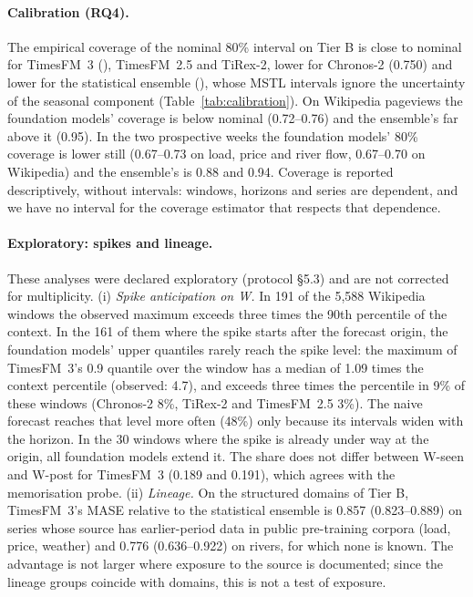 \paragraph{Calibration (RQ4).} The empirical coverage of the nominal 80\% interval on Tier B is close to nominal for TimesFM~3
(\CovBtfm{}), TimesFM~2.5 and TiRex-2, lower for Chronos-2 (0.750) and lower for the statistical ensemble (\CovBstat{}), whose MSTL
intervals ignore the uncertainty of the seasonal component (Table~\ref{tab:calibration}). On Wikipedia pageviews the foundation models'
coverage is below nominal (0.72--0.76) and the ensemble's far above it (0.95). In the two prospective weeks the foundation models'
80\% coverage is lower still (0.67--0.73 on load, price and river flow, 0.67--0.70 on Wikipedia) and the ensemble's is 0.88 and
0.94. Coverage is reported descriptively, without
intervals: windows, horizons and series are dependent, and we have no interval for the coverage estimator that respects that
dependence.

\paragraph{Exploratory: spikes and lineage.} These analyses were declared exploratory (protocol \S{}5.3) and are not corrected for
multiplicity. (i) \emph{Spike anticipation on W.} In 191 of the 5{,}588 Wikipedia windows the observed maximum exceeds three times
the 90th percentile of the context. In the 161 of them where the spike starts after the forecast origin, the foundation models' upper
quantiles rarely reach the spike level: the maximum of TimesFM~3's 0.9 quantile over the window has a median of 1.09 times the context percentile (observed:
4.7), and exceeds three times the percentile in 9\% of these windows (Chronos-2 8\%, TiRex-2 and TimesFM~2.5 3\%). The naive
forecast reaches that level more often (48\%) only because its intervals widen with the horizon. In the 30 windows where the spike is
already under way at the origin, all foundation models extend it. The share does not differ between W-seen and W-post for TimesFM~3
(0.189 and 0.191), which agrees with the memorisation probe. (ii) \emph{Lineage.} On the structured domains of Tier B,
TimesFM~3's MASE relative to the statistical ensemble is 0.857 (0.823--0.889) on series whose source has earlier-period data in
public pre-training corpora (load, price, weather) and 0.776 (0.636--0.922) on rivers, for which none is known. The advantage is not
larger where exposure to the source is documented; since the lineage groups coincide with domains, this is not a test of exposure.

